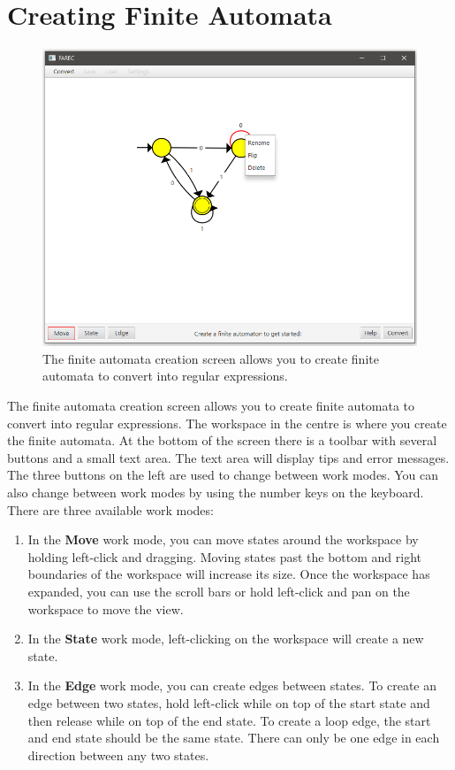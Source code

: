 \documentclass[12pt]{report}
\begin{document}
\section{Creating Finite Automata} \label{CreatingFiniteAutomata}

\begin{figure}[htb]
    \centering
    \includegraphics[width=\textwidth]{./Diagrams/CreateFAScreen.png}
    \caption{The finite automata creation screen allows you to create finite
    automata to convert into regular expressions.}
    \label{CreateFAScreen}
\end{figure}

The finite automata creation screen allows you to create finite automata to
convert into regular expressions. The workspace in the centre is where you
create the finite automata. At the bottom of the screen there is a toolbar with
several buttons and a small text area. The text area will display tips and error
messages. The three buttons on the left are used to change between work modes.
You can also change between work modes by using the number keys on the keyboard.
There are three available work modes:

\begin{enumerate}
    \item In the \textbf{Move} work mode, you can move states around the
    workspace by holding left-click and dragging. Moving states past the bottom
    and right boundaries of the workspace will increase its size. Once the
    workspace has expanded, you can use the scroll bars or hold left-click and
    pan on the workspace to move the view.
    \item In the \textbf{State} work mode, left-clicking on the workspace will
    create a new state.
    \item In the \textbf{Edge} work mode, you can create edges between states.
    To create an edge between two states, hold left-click while on top of the
    start state and then release while on top of the end state. To create a loop
    edge, the start and end state should be the same state. There can only be
    one edge in each direction between any two states.
\end{enumerate}
\end{document}
